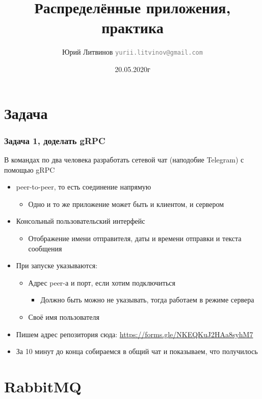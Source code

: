 \documentclass[xetex,mathserif,serif]{beamer}
\title{Распределённые приложения, практика}
\author[Юрий Литвинов]{Юрий Литвинов \newline \textcolor{gray}{\small\texttt{yurii.litvinov@gmail.com}}}
\date{20.05.2020г}
\begin{document}
    \frame{\titlepage}

    \section{Задача}

    \begin{frame}
        \frametitle{Задача 1, доделать gRPC}
        \begin{footnotesize}
            В командах по два человека разработать сетевой чат (наподобие Telegram) с помощью gRPC
            \begin{itemize}
                \item peer-to-peer, то есть соединение напрямую
                \begin{itemize}
                    \item Одно и то же приложение может быть и клиентом, и сервером
                \end{itemize}
                \item Консольный пользовательский интерфейс
                \begin{itemize}
                    \item Отображение имени отправителя, даты и времени отправки и текста сообщения
                \end{itemize}
                \item При запуске указываются:
                \begin{itemize}
                    \item Адрес peer-а и порт, если хотим подключиться
                    \begin{itemize}
                        \item Должно быть можно не указывать, тогда работаем в режиме сервера
                    \end{itemize}
                    \item Своё имя пользователя
                \end{itemize}
                \item Пишем адрес репозитория сюда: \url{https://forms.gle/NKEQKuJ2HAa8syhM7}
                \item За 10 минут до конца собираемся в общий чат и показываем, что получилось
            \end{itemize}
        \end{footnotesize}
    \end{frame}

    \section{RabbitMQ}
\end{document}

